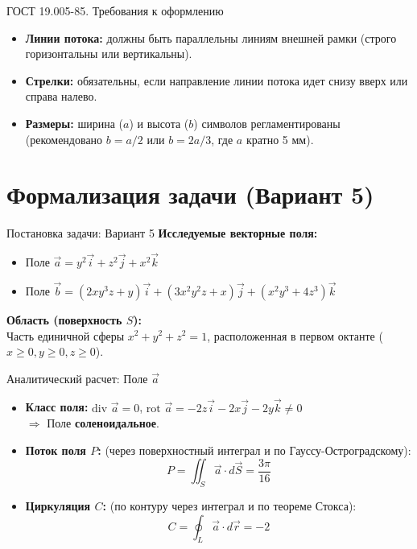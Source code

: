 \documentclass[10pt]{beamer}
\begin{document}
\begin{frame}{ГОСТ 19.005-85. Требования к оформлению}
    \begin{itemize}
        \item \textbf{Линии потока:} должны быть параллельны линиям внешней рамки (строго горизонтальны или вертикальны).
        \item \textbf{Стрелки:} обязательны, если направление линии потока идет снизу вверх или справа налево.
        \item \textbf{Размеры:} ширина ($a$) и высота ($b$) символов регламентированы (рекомендовано $b = a/2$ или $b = 2a/3$, где $a$ кратно 5 мм).
    \end{itemize}
\end{frame}

\section{Формализация задачи (Вариант 5)}

\begin{frame}{Постановка задачи: Вариант 5}
    \textbf{Исследуемые векторные поля:}
    \begin{itemize}
        \item Поле $\vec{a} = y^2 \vec{i} + z^2 \vec{j} + x^2 \vec{k}$
        \item Поле $\vec{b} = (2xy^3z + y) \vec{i} + (3x^2y^2z + x) \vec{j} + (x^2y^3 + 4z^3) \vec{k}$
    \end{itemize}
    \vspace{0.5cm}
    \textbf{Область (поверхность $S$):} \\
    Часть единичной сферы $x^2 + y^2 + z^2 = 1$, расположенная в первом октанте ($x \ge 0, y \ge 0, z \ge 0$).
\end{frame}

\begin{frame}{Аналитический расчет: Поле $\vec{a}$}
    \begin{itemize}
        \item \textbf{Класс поля:} $\text{div }\vec{a} = 0$, $\text{rot }\vec{a} = -2z\vec{i} - 2x\vec{j} - 2y\vec{k} \neq 0$ \\
        $\Rightarrow$ Поле \textbf{соленоидальное}.
        \vspace{0.3cm}
        \item \textbf{Поток поля $P$:} (через поверхностный интеграл и по Гауссу-Остроградскому):
        $$ P = \iint_S \vec{a} \cdot d\vec{S} = \frac{3\pi}{16} $$
        \vspace{0.1cm}
        \item \textbf{Циркуляция $C$:} (по контуру через интеграл и по теореме Стокса):
        $$ C = \oint_L \vec{a} \cdot d\vec{r} = -2 $$
    \end{itemize}
\end{frame}
\end{document}
